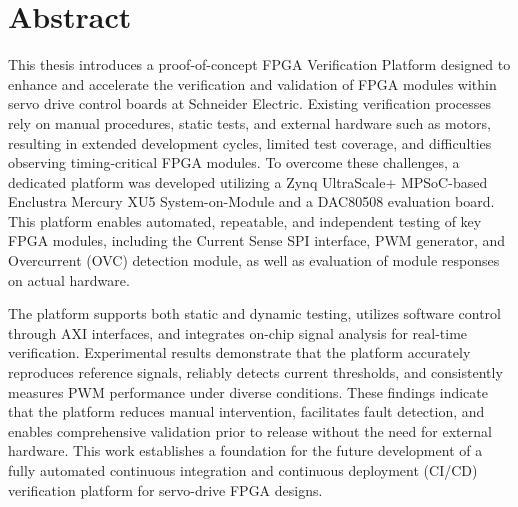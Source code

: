 \thispagestyle{empty} 
\chapter*{Abstract}

This thesis introduces a proof-of-concept FPGA Verification Platform designed to enhance and accelerate the verification and validation of FPGA modules within servo drive control boards at Schneider Electric. Existing verification processes rely on manual procedures, static tests, and external hardware such as motors, resulting in extended development cycles, limited test coverage, and difficulties observing timing-critical FPGA modules. To overcome these challenges, a dedicated platform was developed utilizing a Zynq UltraScale+ MPSoC-based Enclustra Mercury XU5 System-on-Module and a DAC80508 evaluation board. This platform enables automated, repeatable, and independent testing of key FPGA modules, including the Current Sense SPI interface, PWM generator, and Overcurrent (OVC) detection module, as well as evaluation of module responses on actual hardware.

The platform supports both static and dynamic testing, utilizes software control through AXI interfaces, and integrates on-chip signal analysis for real-time verification. Experimental results demonstrate that the platform accurately reproduces reference signals, reliably detects current thresholds, and consistently measures PWM performance under diverse conditions. These findings indicate that the platform reduces manual intervention, facilitates fault detection, and enables comprehensive validation prior to release without the need for external hardware. This work establishes a foundation for the future development of a fully automated continuous integration and continuous deployment (CI/CD) verification platform for servo-drive FPGA designs.
